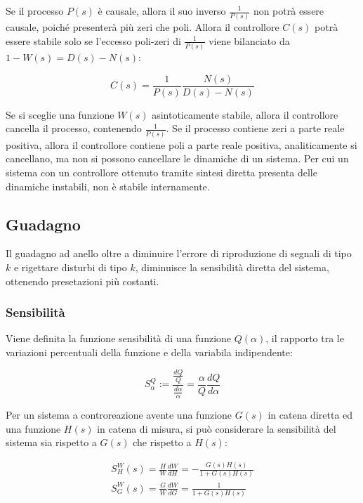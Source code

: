 \documentclass{article}
\numberwithin{equation}{subsection}
\begin{document}
Se il processo $P(s)$ è causale, allora il suo inverso $\displaystyle\frac{1}{P(s)}$ non potrà essere causale, poiché presenterà più zeri che poli. Allora il controllore $C(s)$ 
potrà essere stabile solo se l'eccesso poli-zeri di $\displaystyle\frac{1}{P(s)}$ viene bilanciato da $1-W(s)=D(s)-N(s)$: 

\begin{equation}
    C(s)=\displaystyle\frac{1}{P(s)}\frac{N(s)}{D(s)-N(s)}
\end{equation}

Se si sceglie una funzione $W(s)$ asintoticamente stabile, allora il controllore cancella il processo, contenendo $\displaystyle\frac{1}{P(s)}$. Se il processo contiene zeri 
a parte reale positiva, allora il controllore contiene poli a parte reale positiva, analiticamente si cancellano, ma non si possono cancellare le dinamiche di un sistema.  
Per cui un sistema con un controllore ottenuto tramite sintesi diretta presenta delle dinamiche instabili, non è stabile internamente. 

\subsection{Guadagno}

Il guadagno ad anello oltre a diminuire l'errore di riproduzione di segnali di tipo $k$ e rigettare disturbi di tipo $k$, diminuisce la sensibilità diretta del 
sistema, ottenendo presetazioni più costanti. \\

\subsubsection{Sensibilità}

Viene definita la funzione sensibilità di una funzione $Q(\alpha)$, il rapporto tra le variazioni percentuali della funzione e della variabila indipendente:

\begin{equation}
    S_{\alpha}^Q:=\displaystyle\frac{\displaystyle\frac{dQ}{Q}}{\displaystyle\frac{d\alpha}{\alpha}}=\frac{\alpha}{Q}\frac{dQ}{d\alpha}
\end{equation}

Per un sistema a controreazione avente una funzione $G(s)$ in catena diretta ed una funzione $H(s)$ in catena di misura, si può considerare la sensibilità del sistema 
sia rispetto a $G(s)$ che rispetto a $H(s)$:

\begin{gather}
    S_H^W(s)=\displaystyle\frac{H}{W}\frac{dW}{dH}=-\frac{G(s)H(s)}{1+G(s)H(s)}\\
    S_G^W(s)=\displaystyle\frac{G}{W}\frac{dW}{dG}=\frac{1}{1+G(s)H(s)}
\end{gather}
\end{document}
